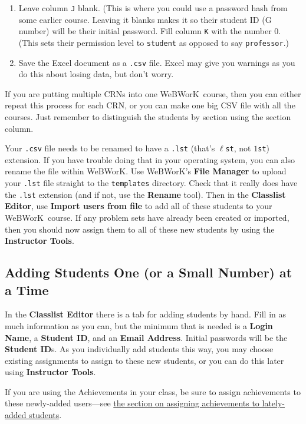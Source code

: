 \documentclass[12pt]{article}
\newcommand{\menu}[1]{\textbf{#1}}
\newcommand{\WW}{WeBWorK}
\begin{document}
\begin{enumerate}
\item Leave column \texttt{J} blank. (This is where you could use a password hash from some earlier course. Leaving it blanks makes it so their student ID (G number) will be their initial password. Fill column \texttt{K} with the number 0. (This sets their permission level to \texttt{student} as opposed to say \texttt{professor}.)
\item Save the Excel document as a \texttt{.csv} file. Excel may give you warnings as you do this about losing data, but don't worry.
\end{enumerate}

If you are putting multiple CRNs into one \WW\ course, then you can either repeat this process for each CRN, or you can make one big CSV file with all the courses. Just remember to distinguish the students by section using the section column.

Your \texttt{.csv} file needs to be renamed to have a \texttt{.lst} (that's $\ell$\texttt{st}, not
$1$\texttt{st}) extension. If you have trouble doing that in your operating system, you can also rename the file within \WW. Use \WW's \menu{File Manager} to upload your \texttt{.lst} file straight to the \texttt{templates} directory. Check that it really does have the \texttt{.lst} extension (and if not, use the \menu{Rename} tool). Then in the \menu{Classlist Editor}, use \menu{Import users from file} to add all of these students to your \WW\ course. If any problem sets have already been created or imported, then you should now assign them to all of these new students by using the \menu{Instructor Tools}.


\subsection{Adding Students One (or a Small Number) at a Time}
In the \menu{Classlist Editor} there is a tab for adding students by hand.  Fill in as much information as you can, but the minimum that is needed is a \menu{Login Name}, a \menu{Student ID}, and an \menu{Email Address}. Initial passwords will be the \menu{Student ID}s.  As you individually add students this way, you may choose existing assignments to assign to these new students, or you can do this later using \menu{Instructor Tools}.

If you are using the Achievements in your class, be sure to assign achievements to these newly-added users---see \hyperref[achievementslateaddstudents]{the section on assigning achievements to lately-added students}.
\end{document}
